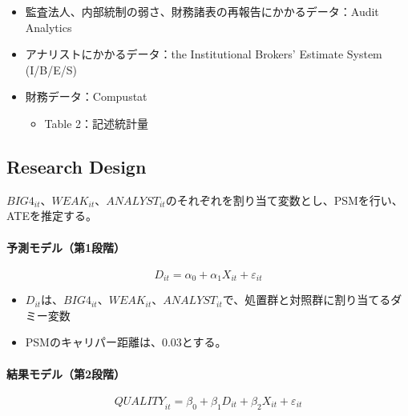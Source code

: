\begin{itemize}
 \item 監査法人、内部統制の弱さ、財務諸表の再報告にかかるデータ：Audit Analytics
 \item アナリストにかかるデータ：the Institutional Brokers’ Estimate System (I/B/E/S)
 \item 財務データ：Compustat
  \begin{itemize}
   \item Table 2：記述統計量
  \end{itemize}
\end{itemize}

\subsection*{Research Design}

$\mathit{BIG}4_{it}$、$\mathit{WEAK}_{it}$、$\mathit{ANALYST}_{it}$のそれぞれを割り当て変数とし、PSMを行い、ATEを推定する。

\paragraph{予測モデル（第1段階）}

\begin{equation}
\mathit{D}_{it} = \alpha_0 + \alpha_1 \mathit{X}_{it} + \varepsilon_{it}
\end{equation}

\begin{itemize}
 \item $\mathit{D}_{it}$は、$\mathit{BIG}4_{it}$、$\mathit{WEAK}_{it}$、$\mathit{ANALYST}_{it}$で、処置群と対照群に割り当てるダミー変数
 \item PSMのキャリパー距離は、0.03とする。
\end{itemize}

\paragraph{結果モデル（第2段階）}

\begin{equation}
\mathit{QUALITY}_{it} = \beta_0 + \beta_1 \mathit{D}_{it} + \beta_2 \mathit{X}_{it} +\varepsilon_{it}
\end{equation}

